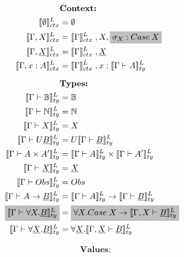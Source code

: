 \documentclass[acmsmall]{acmart}
\newcommand{\den}[1]{\llbracket #1\rrbracket}
\newcommand{\denLty}[1]{\den{#1}^L_{ty}}
\begin{document}
\begin{figure}[!htbp]
  \centering
  \scriptsize
  \begin{minipage}[t]{0.48\textwidth}
    \[
    \begin{aligned}
      &\textbf{Context:} \\
      \den{\emptyset }^L_{ctx} &= \emptyset \\
      \den{\Gamma,X  }^L_{ctx} &= \den{\Gamma }^L_{ctx} \;, X,\colorbox{lightgray}{$\sigma_X: Case\:X$} \\
      \den{\Gamma,\underline{X}  }^L_{ctx} &= \den{\Gamma }^L_{ctx}\; , \underline{X} \\
      \den{\Gamma, x : A }^L_{ctx} &= \den{\Gamma }^L_{ctx}\; , x : \den{\Gamma \vdash A}^L_{ty} \\[0.5em]
      &\textbf{Types:} \\
      \denLty{\Gamma \vdash \mathbb{B}} &= \mathbb{B} \\
      \denLty{\Gamma \vdash \mathbb{N}} &= \mathbb{N} \\
      \denLty{\Gamma \vdash X} &= X \\
      \denLty{\Gamma \vdash U\underline{B}} &= U \denLty{\Gamma \vdash \underline{B}} \\
      \denLty{\Gamma \vdash A \times A'} &= \denLty{\Gamma \vdash A} \times \denLty{\Gamma \vdash A'} \\
      \denLty{\Gamma \vdash \underline{X}} &= \underline{X} \\
      \denLty{\Gamma \vdash Obs} &= Obs \\
      \denLty{\Gamma \vdash A \rightarrow \underline{B}} &= \denLty{\Gamma \vdash A} \rightarrow \denLty{\Gamma \vdash \underline{B}} \\
      \colorbox{lightgray}{$\denLty{\Gamma \vdash \forall X . \underline{B}}$} &= \colorbox{lightgray}{$\forall X. Case \;X \rightarrow \denLty{\Gamma,X \vdash \underline{B}}$} \\
      \denLty{\Gamma \vdash \forall \underline{X}. \underline{B}} &= \forall \underline{X}. \denLty{\Gamma,\underline{X} \vdash \underline{B}}
    \end{aligned}
    \]
  \end{minipage}\hspace{2em}%
  \begin{minipage}[t]{0.48\textwidth}
    \[
    \begin{aligned}
      &\textbf{Values:} \\

\end{aligned}\]
\end{minipage}
\end{figure}
\end{document}

